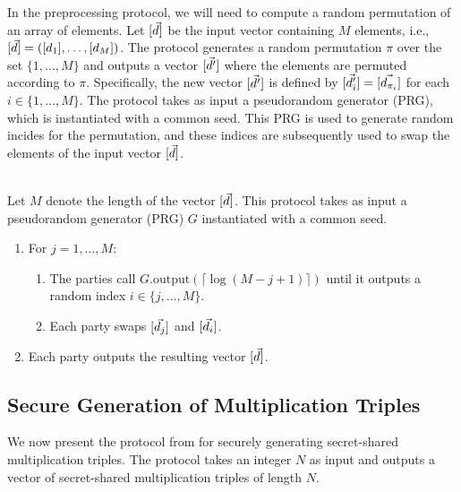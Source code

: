 In the preprocessing protocol, we will need to compute a random permutation of an array of elements.
Let $[\vec{d}]$ be the input vector containing $M$ elements, 
i.e., $[\vec{d}] = ([d_1], \ldots, [d_M])$.
The protocol generates a random permutation $\pi$ over the set $\{1, \ldots, M\}$ and outputs a vector $[\vec{d'}]$ where the elements are permuted according to $\pi$.
Specifically, the new vector $[\vec{d'}]$ is defined by $[\vec{d_i'}] = [\vec{d_{\pi_i}}]$ for each $i \in \{1, \ldots, M\}$.
The protocol takes as input a pseudorandom generator (PRG), which is instantiated with a common seed.
This PRG is used to generate random incides for the permutation, and these indices are subsequently used to swap the elements of the input vector $[\vec{d}]$.

\begin{protocol}
    \label{protocol:perm}
     \\
    Let $M$ denote the length of the vector $[\vec{d}]$. This protocol takes as input a pseudorandom generator (PRG) $G$ instantiated with a common seed. 
    \begin{enumerate}
        \item For $j = 1, \ldots, M$:
        \begin{enumerate}
            \item The parties call $G.\mbox{output}(\lceil \log (M-j+1) \rceil)$ until it outputs a random index $i \in \{j, \ldots, M\}$.
	    \item Each party swaps $[\vec{d_j}]$ and $[\vec{d_i}]$.
        \end{enumerate}
        \item Each party outputs the resulting vector $[\vec{d}]$.
    \end{enumerate}
\end{protocol}

\subsection{Secure Generation of Multiplication Triples}

We now present the protocol from \cite{SP:ABFLLN17} for securely generating secret-shared multiplication triples.
The protocol takes an integer $N$ as input and outputs a vector of secret-shared multiplication triples of length $N$.

